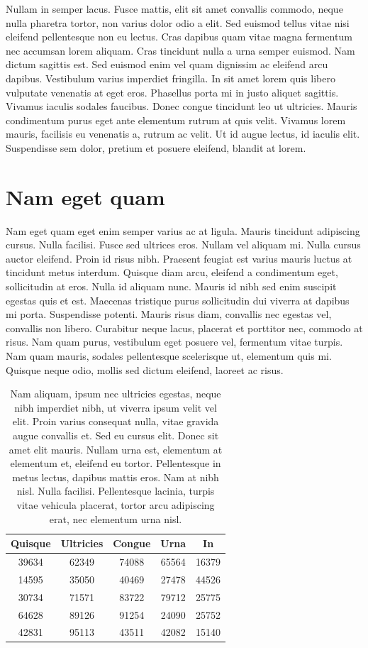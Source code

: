 Nullam in semper lacus.
Fusce mattis, elit sit amet convallis commodo, neque nulla pharetra tortor, non varius dolor odio a elit.
Sed euismod tellus vitae nisi eleifend pellentesque non eu lectus.
Cras dapibus quam vitae magna fermentum nec accumsan lorem aliquam.
Cras tincidunt nulla a urna semper euismod.
Nam dictum sagittis est.
Sed euismod enim vel quam dignissim ac eleifend arcu dapibus.
Vestibulum varius imperdiet fringilla.
In sit amet lorem quis libero vulputate venenatis at eget eros.
Phasellus porta mi in justo aliquet sagittis.
Vivamus iaculis sodales faucibus.
Donec congue tincidunt leo ut ultricies.
Mauris condimentum purus eget ante elementum rutrum at quis velit.
Vivamus lorem mauris, facilisis eu venenatis a, rutrum ac velit.
Ut id augue lectus, id iaculis elit.
Suspendisse sem dolor, pretium et posuere eleifend, blandit at lorem.

\section{Nam eget quam}
Nam eget quam eget enim semper varius ac at ligula.
Mauris tincidunt adipiscing cursus.
Nulla facilisi.
Fusce sed ultrices eros.
Nullam vel aliquam mi.
Nulla cursus auctor eleifend.
Proin id risus nibh.
Praesent feugiat est varius mauris luctus at tincidunt metus interdum.
Quisque diam arcu, eleifend a condimentum eget, sollicitudin at eros.
Nulla id aliquam nunc.
Mauris id nibh sed enim suscipit egestas quis et est.
Maecenas tristique purus sollicitudin dui viverra at dapibus mi porta.
Suspendisse potenti.
Mauris risus diam, convallis nec egestas vel, convallis non libero.
Curabitur neque lacus, placerat et porttitor nec, commodo at risus.
Nam quam purus, vestibulum eget posuere vel, fermentum vitae turpis.
Nam quam mauris, sodales pellentesque scelerisque ut, elementum quis mi.
Quisque neque odio, mollis sed dictum eleifend, laoreet ac risus.

\begin{table}[t]
  \centering
  \begin{tabular}{ccccc}
    \toprule
    Quisque & Ultricies & Congue & Urna & In\\
    \midrule
    39634 & 62349 & 74088 & 65564 & 16379\\
    14595 & 35050 & 40469 & 27478 & 44526\\
    30734 & 71571 & 83722 & 79712 & 25775\\
    64628 & 89126 & 91254 & 24090 & 25752\\
    42831 & 95113 & 43511 & 42082 & 15140\\
    \bottomrule
  \end{tabular}
  \caption[Nam aliquam]{
    Nam aliquam, ipsum nec ultricies egestas, neque nibh imperdiet nibh, ut viverra ipsum velit vel elit.
Proin varius consequat nulla, vitae gravida augue convallis et.
Sed eu cursus elit.
Donec sit amet elit mauris.
Nullam urna est, elementum at elementum et, eleifend eu tortor.
Pellentesque in metus lectus, dapibus mattis eros.
Nam at nibh nisl.
Nulla facilisi.
Pellentesque lacinia, turpis vitae vehicula placerat, tortor arcu adipiscing erat, nec elementum urna nisl.
  }
\end{table}

